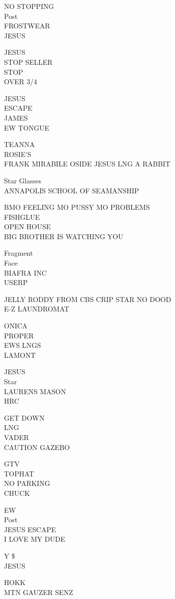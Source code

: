\documentclass[10pt,letterpaper]{article}
\begin{document}
NO STOPPING\\
Post\\
FROSTWEAR\\
JESUS

JESUS\\
STOP SELLER\\
STOP\\
OVER 3/4

JESUS\\
ESCAPE\\
JAMES\\
EW TONGUE

TEANNA\\
ROSIE'S\\
FRANK MIRABILE OSIDE JESUS LNG A RABBIT

Star Glasses\\
ANNAPOLIS SCHOOL OF SEAMANSHIP

BMO FEELING MO PUSSY MO PROBLEMS\\
FISHGLUE\\
OPEN HOUSE\\
BIG BROTHER IS WATCHING YOU

Fragment\\
Face\\
BIAFRA INC\\
USERP

JELLY RODDY FROM CBS CRIP STAR NO DOOD\\
E{-}Z LAUNDROMAT

ONICA\\
PROPER\\
EWS LNGS\\
LAMONT

JESUS\\
Star\\
LAURENS MASON\\
HRC

GET DOWN\\
LNG\\
VADER\\
CAUTION GAZEBO

GTV\\
TOPHAT\\
NO PARKING\\
CHUCK

EW\\
Post\\
JESUS ESCAPE\\
I LOVE MY DUDE

Y \$\\
JESUS

HOKK\\
MTN GAUZER SENZ
\end{document}
